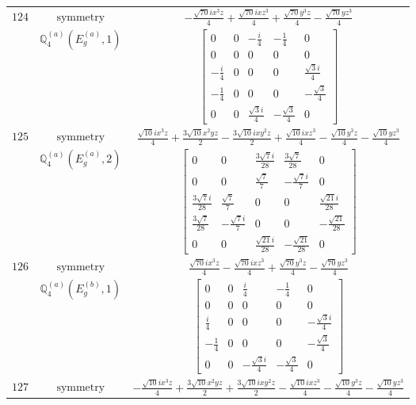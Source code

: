 \documentclass[fleqn,8pt,landscape]{jsarticle}
\begin{document}
\begin{longtable}{ccc}
$ 124 $ & $ \text{symmetry} $ & $ - \frac{\sqrt{70} i x^{3} z}{4} + \frac{\sqrt{70} i x z^{3}}{4} + \frac{\sqrt{70} y^{3} z}{4} - \frac{\sqrt{70} y z^{3}}{4} $ \\
$  $ & $ \mathbb{Q}_{4}^{(a)}(E_{g}^{(a)},1) $ & $ \begin{bmatrix} 0 & 0 & - \frac{i}{4} & - \frac{1}{4} & 0 \\ 0 & 0 & 0 & 0 & 0 \\ - \frac{i}{4} & 0 & 0 & 0 & \frac{\sqrt{3} i}{4} \\ - \frac{1}{4} & 0 & 0 & 0 & - \frac{\sqrt{3}}{4} \\ 0 & 0 & \frac{\sqrt{3} i}{4} & - \frac{\sqrt{3}}{4} & 0 \end{bmatrix} $ \\ \hline
$ 125 $ & $ \text{symmetry} $ & $ \frac{\sqrt{10} i x^{3} z}{4} + \frac{3 \sqrt{10} x^{2} y z}{2} - \frac{3 \sqrt{10} i x y^{2} z}{2} + \frac{\sqrt{10} i x z^{3}}{4} - \frac{\sqrt{10} y^{3} z}{4} - \frac{\sqrt{10} y z^{3}}{4} $ \\
$  $ & $ \mathbb{Q}_{4}^{(a)}(E_{g}^{(a)},2) $ & $ \begin{bmatrix} 0 & 0 & \frac{3 \sqrt{7} i}{28} & \frac{3 \sqrt{7}}{28} & 0 \\ 0 & 0 & \frac{\sqrt{7}}{7} & - \frac{\sqrt{7} i}{7} & 0 \\ \frac{3 \sqrt{7} i}{28} & \frac{\sqrt{7}}{7} & 0 & 0 & \frac{\sqrt{21} i}{28} \\ \frac{3 \sqrt{7}}{28} & - \frac{\sqrt{7} i}{7} & 0 & 0 & - \frac{\sqrt{21}}{28} \\ 0 & 0 & \frac{\sqrt{21} i}{28} & - \frac{\sqrt{21}}{28} & 0 \end{bmatrix} $ \\ \hline
$ 126 $ & $ \text{symmetry} $ & $ \frac{\sqrt{70} i x^{3} z}{4} - \frac{\sqrt{70} i x z^{3}}{4} + \frac{\sqrt{70} y^{3} z}{4} - \frac{\sqrt{70} y z^{3}}{4} $ \\
$  $ & $ \mathbb{Q}_{4}^{(a)}(E_{g}^{(b)},1) $ & $ \begin{bmatrix} 0 & 0 & \frac{i}{4} & - \frac{1}{4} & 0 \\ 0 & 0 & 0 & 0 & 0 \\ \frac{i}{4} & 0 & 0 & 0 & - \frac{\sqrt{3} i}{4} \\ - \frac{1}{4} & 0 & 0 & 0 & - \frac{\sqrt{3}}{4} \\ 0 & 0 & - \frac{\sqrt{3} i}{4} & - \frac{\sqrt{3}}{4} & 0 \end{bmatrix} $ \\ \hline
$ 127 $ & $ \text{symmetry} $ & $ - \frac{\sqrt{10} i x^{3} z}{4} + \frac{3 \sqrt{10} x^{2} y z}{2} + \frac{3 \sqrt{10} i x y^{2} z}{2} - \frac{\sqrt{10} i x z^{3}}{4} - \frac{\sqrt{10} y^{3} z}{4} - \frac{\sqrt{10} y z^{3}}{4} $ \\

\end{longtable}
\end{document}
